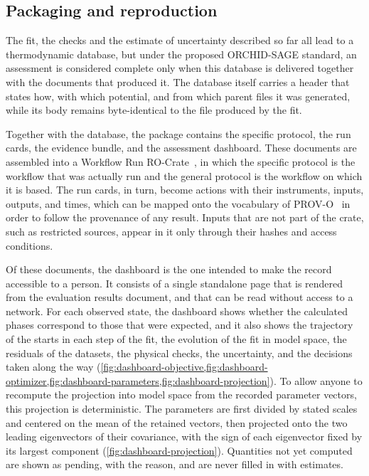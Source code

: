 \subsection{Packaging and reproduction}
\label{sec:methods:package}

The fit, the checks and the estimate of uncertainty described so far all lead to a thermodynamic database, but under the proposed ORCHID-SAGE standard, an assessment is considered complete only when this database is delivered together with the documents that produced it. The database itself carries a header that states how, with which potential, and from which parent files it was generated, while its body remains byte-identical to the file produced by the fit. 

Together with the database, the package contains the specific protocol, the run cards, the evidence bundle, and the assessment dashboard. These documents are assembled into a Workflow Run RO-Crate~\cite{soilandreyes2022rocrate,leo2024wrroc}, in which the specific protocol is the workflow that was actually run and the general protocol is the workflow on which it is based. The run cards, in turn, become actions with their instruments, inputs, outputs, and times, which can be mapped onto the vocabulary of PROV-O~\cite{lebo2013provo} in order to follow the provenance of any result. Inputs that are not part of the crate, such as restricted sources, appear in it only through their hashes and access conditions.

Of these documents, the dashboard is the one intended to make the record accessible to a person. It consists of a single standalone page that is rendered from the evaluation results document, and that can be read without access to a network. For each observed state, the dashboard shows whether the calculated phases correspond to those that were expected, and it also shows the trajectory of the starts in each step of the fit, the evolution of the fit in model space, the residuals of the datasets, the physical checks, the uncertainty, and the decisions taken along the way (\cref{fig:dashboard-objective,fig:dashboard-optimizer,fig:dashboard-parameters,fig:dashboard-projection}). To allow anyone to recompute the projection into model space from the recorded parameter vectors, this projection is deterministic. The parameters are first divided by stated scales and centered on the mean of the retained vectors, then projected onto the two leading eigenvectors of their covariance, with the sign of each eigenvector fixed by its largest component (\cref{fig:dashboard-projection}). Quantities not yet computed are shown as pending, with the reason, and are never filled in with estimates.

